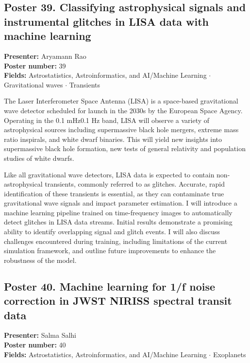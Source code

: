 \hypertarget{poster-abstract-talk-59}{}\label{poster-abstract-page-talk-59}
\subsection*{Poster 39. Classifying astrophysical signals and instrumental glitches in LISA data with machine learning}
\textbf{Presenter:} Aryamann Rao\\
\textbf{Poster number:} 39\\
\textbf{Fields:} Astrostatistics, Astroinformatics, and AI/Machine Learning $\cdot$ Gravitational waves $\cdot$ Transients

The Laser Interferometer Space Antenna (LISA) is a space-based gravitational wave detector scheduled for launch in the 2030s by the European Space Agency. Operating in the 0.1 mHz0.1 Hz band, LISA will observe a variety of astrophysical sources including supermassive black hole mergers, extreme mass ratio inspirals, and white dwarf binaries. This will yield new insights into supermassive black hole formation, new tests of general relativity and population studies of white dwarfs.

Like all gravitational wave detectors, LISA data is expected to contain non-astrophysical transients, commonly referred to as glitches. Accurate, rapid identification of these transients is essential, as they can contaminate true gravitational wave signals and impact parameter estimation. I will introduce a machine learning pipeline trained on time-frequency images to automatically detect glitches in LISA data streams. Initial results demonstrate a promising ability to identify overlapping signal and glitch events. I will also discuss challenges encountered during training, including limitations of the current simulation framework, and outline future improvements to enhance the robustness of the model.

\hypertarget{poster-abstract-talk-138}{}\label{poster-abstract-page-talk-138}
\subsection*{Poster 40. Machine learning for 1/f noise correction in JWST NIRISS spectral transit data}
\textbf{Presenter:} Salma Salhi\\
\textbf{Poster number:} 40\\
\textbf{Fields:} Astrostatistics, Astroinformatics, and AI/Machine Learning $\cdot$ Exoplanets

